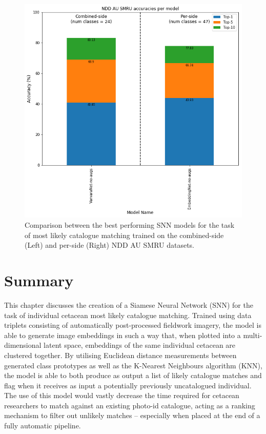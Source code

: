 \begin{figure}
	\begin{center}
		\includegraphics[scale=0.4]{Chapter5/figs/NDDAUSMRU-combined-and-per-side-comparison.png}
	\end{center}
	\caption{Comparison between the best performing SNN models for the task of most likely catalogue matching trained on the combined-side (Left) and per-side (Right) NDD AU SMRU datasets.}
	\label{fig:NDDAUSMRU-combined-and-per-side-comparison-individual-classification-only}
\end{figure}

\section{Summary}\label{ch:ID,sec:Summary}

This chapter discusses the creation of a Siamese Neural Network (SNN) for the task of individual cetacean most likely catalogue matching. Trained using data triplets consisting of automatically post-processed fieldwork imagery, the model is able to generate image embeddings in such a way that, when plotted into a multi-dimensional latent space, embeddings of the same individual cetacean are clustered together. By utilising Euclidean distance measurements between generated class prototypes as well as the K-Nearest Neighbours algorithm (KNN), the model is able to both produce as output a list of likely catalogue matches and flag when it receives as input a potentially previously uncatalogued individual. The use of this model would vastly decrease the time required for cetacean researchers to match against an existing photo-id catalogue, acting as a ranking mechanism to filter out unlikely matches -- especially when placed at the end of a fully automatic pipeline.

